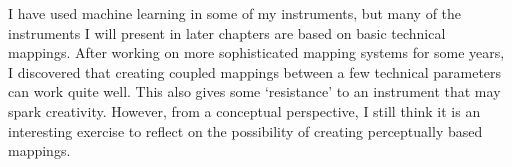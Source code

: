 I have used machine learning in some of my instruments, but many of the instruments I will present in later chapters are based on basic technical mappings. After working on more sophisticated mapping systems for some years, I discovered that creating coupled mappings between a few technical parameters can work quite well. This also gives some `resistance' to an instrument that may spark creativity. However, from a conceptual perspective, I still think it is an interesting exercise to reflect on the possibility of creating perceptually based mappings.
